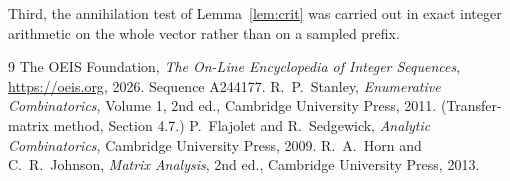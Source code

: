 \documentclass[11pt,a4paper]{article}
\theoremstyle{plain}
\theoremstyle{definition}
\begin{document}
Third, the annihilation test of Lemma~\ref{lem:crit} was carried out in exact integer
arithmetic on the whole vector rather than on a sampled prefix.

\begin{thebibliography}{9}
 The OEIS Foundation, \emph{The On-Line Encyclopedia of Integer
Sequences}, \url{https://oeis.org}, 2026. Sequence A244177.
 R.~P.~Stanley, \emph{Enumerative Combinatorics}, Volume 1, 2nd ed.,
Cambridge University Press, 2011. (Transfer-matrix method, Section 4.7.)
 P.~Flajolet and R.~Sedgewick, \emph{Analytic Combinatorics}, Cambridge
University Press, 2009.
 R.~A.~Horn and C.~R.~Johnson, \emph{Matrix Analysis}, 2nd ed., Cambridge
University Press, 2013.
\end{thebibliography}
\end{document}
